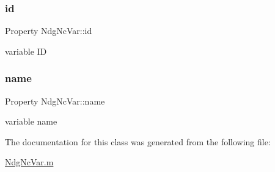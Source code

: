 \subsubsection{\texorpdfstring{id}{id}}
{\footnotesize\ttfamily Property Ndg\+Nc\+Var\+::id\hspace{0.3cm}{\ttfamily [private]}}



variable ID 

\mbox{\label{class_ndg_nc_var_a102edac9545f8977fa7d7532241b609d}} 
\subsubsection{\texorpdfstring{name}{name}}
{\footnotesize\ttfamily Property Ndg\+Nc\+Var\+::name\hspace{0.3cm}{\ttfamily [private]}}



variable name 



The documentation for this class was generated from the following file\+:\begin{DoxyCompactItemize}
\item 
\hyperlink{_ndg_nc_var_8m}{Ndg\+Nc\+Var.\+m}\end{DoxyCompactItemize}
